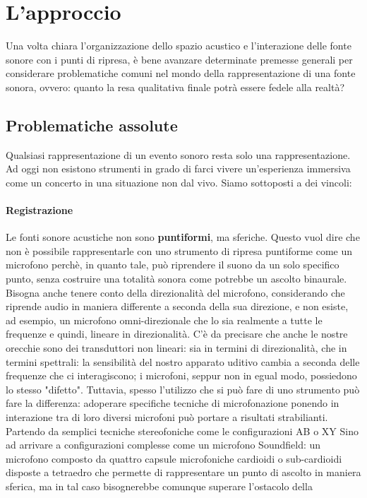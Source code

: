 \section{L'approccio}
Una volta chiara l'organizzazione dello spazio acustico e l'interazione delle fonte sonore con i punti di ripresa, è bene avanzare determinate premesse generali per considerare problematiche comuni nel mondo della rappresentazione di una fonte sonora, ovvero: quanto la resa qualitativa finale potrà essere fedele alla realtà?

	\subsection{Problematiche assolute}
	Qualsiasi rappresentazione di un evento sonoro resta solo una rappresentazione. Ad oggi non esistono strumenti in grado di farci vivere un'esperienza immersiva come un concerto in una situazione non dal vivo. Siamo sottoposti a dei vincoli:
	
	\paragraph{Registrazione} Le fonti sonore acustiche non sono \textbf{puntiformi}, ma sferiche. Questo vuol dire che non è possibile rappresentarle con uno strumento di ripresa puntiforme come un microfono perchè, in quanto tale, può riprendere il suono da un solo specifico punto, senza costruire una totalità sonora come potrebbe un ascolto binaurale. Bisogna anche tenere conto della direzionalità del microfono, considerando che riprende audio in maniera differente a seconda della sua direzione, e non esiste, ad esempio, un microfono omni-direzionale che lo sia realmente a tutte le frequenze e quindi, lineare in direzionalità. C'è da precisare che anche le nostre orecchie sono dei transduttori non lineari: sia in termini di direzionalità, che in termini spettrali: la sensibilità del nostro apparato uditivo cambia a seconda delle frequenze che ci interagiscono; i microfoni, seppur non in egual modo, possiedono lo stesso "difetto".
	Tuttavia, spesso l'utilizzo che si può fare di uno strumento può fare la differenza: adoperare specifiche tecniche di microfonazione ponendo in interazione tra di loro diversi microfoni può portare a risultati strabilianti. Partendo da semplici tecniche stereofoniche come  le configurazioni AB o XY 
	Sino ad arrivare a configurazioni complesse come un microfono Soundfield: un microfono composto da quattro capsule microfoniche cardioidi o sub-cardioidi disposte a tetraedro che permette di rappresentare un punto di ascolto in maniera sferica, ma in tal caso bisognerebbe comunque superare l'ostacolo della
	
